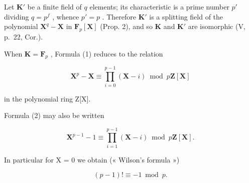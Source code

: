 Let \(\mathbf{K}'\) be a finite field of \(q\) elements; its characteristic is a prime number \(p'\) dividing \(q = p^f\) , whence \(p' = p\) . Therefore \(\mathbf{K}'\) is a splitting field of the polynomial \(\mathbf{X}^q - \mathbf{X}\) in \(\mathbf{F}_p[\mathbf{X}]\) (Prop. 2), and so \(\mathbf{K}\) and \(\mathbf{K}'\) are isomorphic (V, p.~22, Cor.).

When \(\mathbf{K} = \mathbf{F}_p\) , Formula (1) reduces to the relation

\[
\mathbf {X} ^ {p} - \mathbf {X} \equiv \prod_ {i = 0} ^ {p - 1} (\mathbf {X} - i) \bmod p \mathbf {Z} [ \mathbf {X} ]\tag{2}
\]

in the polynomial ring Z{[}X{]}.

Formula (2) may also be written

\[
\mathbf {X} ^ {p - 1} - 1 \equiv \prod_ {i = 1} ^ {p - 1} (\mathbf {X} - i) \bmod p \mathbf {Z} [ \mathbf {X} ].\tag{3}
\]

In particular for X = 0 we obtain (« Wilson's formula »)

\[
(p - 1)! \equiv - 1 \bmod p.\tag{4}
\]


